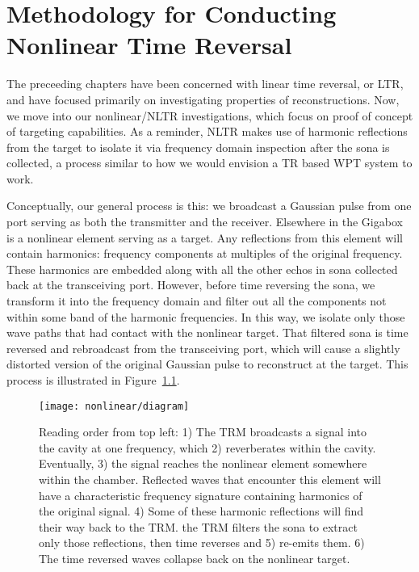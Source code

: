 \chapter{Methodology for Conducting Nonlinear Time Reversal}
\label{ch:nonlinear-meth}

The preceeding chapters have been concerned with linear time reversal, or LTR, and have focused primarily on investigating properties of reconstructions. Now, we move into our nonlinear/NLTR investigations, which focus on proof of concept of targeting capabilities. As a reminder, NLTR makes use of harmonic reflections from the target to isolate it via frequency domain inspection after the sona is collected, a process similar to how we would envision a TR based WPT system to work. 

Conceptually, our general process is this: we broadcast a Gaussian pulse from one port serving as both the transmitter and the receiver. Elsewhere in the Gigabox is a nonlinear element serving as a target. Any reflections from this element will contain harmonics: frequency components at multiples of the original frequency. These harmonics are embedded along with all the other echos in sona collected back at the transceiving port. However, before time reversing the sona, we transform it into the frequency domain and filter out all the components not within some band of the harmonic frequencies. In this way, we isolate only those wave paths that had contact with the nonlinear target. That filtered sona is time reversed and rebroadcast from the transceiving port, which will cause a slightly distorted version of the original Gaussian pulse to reconstruct at the target. This process is illustrated in Figure~\ref{fig:nonlinear-diagram}.

\begin{figure}[h!]
\centering
\texttt{[image: nonlinear/diagram]}
    \caption[Conceptual overview of nonlinear time reversal]{Reading order from top left: 1) The TRM broadcasts a signal into the cavity at one frequency, which 2) reverberates within the cavity. Eventually, 3) the signal reaches the nonlinear element somewhere within the chamber. Reflected waves that encounter this element will have a characteristic frequency signature containing harmonics of the original signal. 4) Some of these harmonic reflections will find their way back to the TRM. the TRM filters the sona to extract only those reflections, then time reverses and 5) re-emits them. 6) The time reversed waves collapse back on the nonlinear target.}
    \label{fig:nonlinear-diagram}
\end{figure}
